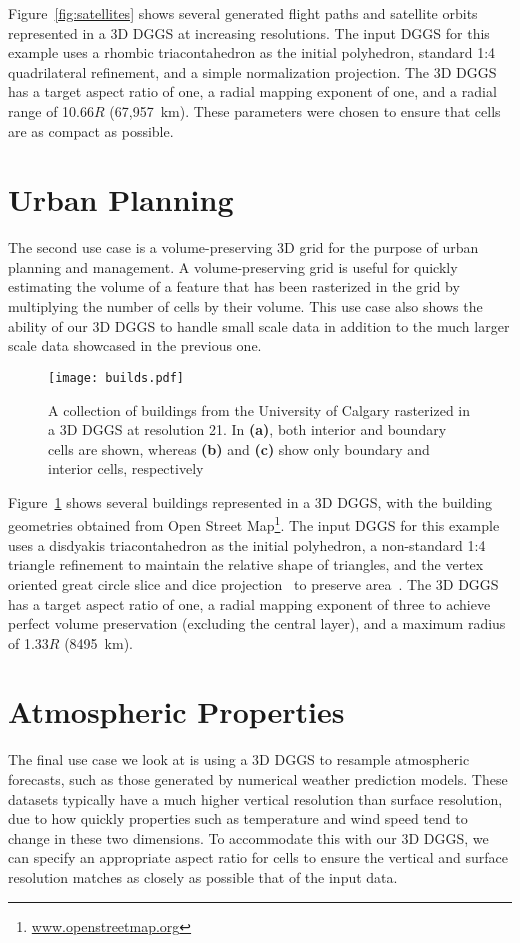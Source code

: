 Figure~\ref{fig:satellites} shows several generated flight paths and satellite orbits represented in a 3D DGGS at increasing resolutions.
The input DGGS for this example uses a rhombic triacontahedron as the initial polyhedron, standard 1:4 quadrilateral refinement, and a simple normalization projection.
The 3D DGGS has a target aspect ratio of one, a radial mapping exponent of one, and a radial range of 10.66$R$ (67,957~km).
These parameters were chosen to ensure that cells are as compact as possible.

\section{Urban Planning}
The second use case is a volume-preserving 3D grid for the purpose of urban planning and management.
A volume-preserving grid is useful for quickly estimating the volume of a feature that has been rasterized in the grid by multiplying the number of cells by their volume.
This use case also shows the ability of our 3D DGGS to handle small scale data in addition to the much larger scale data showcased in the previous one.


\begin{figure}[h]
	\centering
	\texttt{[image: builds.pdf]}
	\caption{A collection of buildings from the University of Calgary rasterized in a 3D DGGS at resolution 21.
		In \textbf{(a)}, both interior and boundary cells are shown, whereas \textbf{(b)} and \textbf{(c)} show only boundary and interior cells, respectively}
	\label{fig:urbanplanning}
\end{figure}


Figure~\ref{fig:urbanplanning} shows several buildings represented in a 3D DGGS, with the building geometries obtained from Open Street Map\footnote{\url{www.openstreetmap.org}}.
The input DGGS for this example uses a disdyakis triacontahedron as the initial polyhedron, a non-standard 1:4 triangle refinement to maintain the relative shape of triangles, and the vertex oriented great circle slice and dice projection~\cite{van2006slice} to preserve area~\cite{hallDT}.
The 3D DGGS has a target aspect ratio of one, a radial mapping exponent of three to achieve perfect volume preservation (excluding the central layer), and a maximum radius of 1.33$R$ (8495~km).


\section{Atmospheric Properties}
The final use case we look at is using a 3D DGGS to resample atmospheric forecasts, such as those generated by numerical weather prediction models.
These datasets typically have a much higher vertical resolution than surface resolution, due to how quickly properties such as temperature and wind speed tend to change in these two dimensions.
To accommodate this with our 3D DGGS, we can specify an appropriate aspect ratio for cells to ensure the vertical and surface resolution matches as closely as possible that of the input data.


